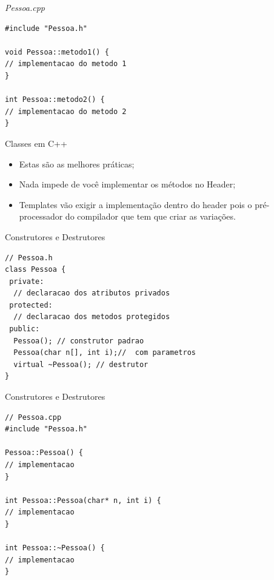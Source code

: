 \documentclass[12pt,table,xcolor={dvipsnames}]{beamer}
\begin{document}
\begin{frame}[fragile]{\textit{Pessoa.cpp}}
\begin{lstlisting}
#include "Pessoa.h"

void Pessoa::metodo1() {
// implementacao do metodo 1
}

int Pessoa::metodo2() {
// implementacao do metodo 2
}
\end{lstlisting}
\end{frame}

\begin{frame}{Classes em C++}
\begin{itemize}
\item Estas são as melhores práticas;
\item Nada impede de você implementar os métodos no Header;
\item Templates vão exigir a implementação dentro do header pois o pré-processador do compilador que tem que criar as variações.
\end{itemize}
\end{frame}

\begin{frame}[fragile]{Construtores e Destrutores}
\begin{lstlisting}
// Pessoa.h
class Pessoa {
 private:
  // declaracao dos atributos privados
 protected:
  // declaracao dos metodos protegidos
 public:
  Pessoa(); // construtor padrao
  Pessoa(char n[], int i);//  com parametros
  virtual ~Pessoa(); // destrutor
}
\end{lstlisting}
\end{frame}

\begin{frame}[fragile]{Construtores e Destrutores}
\begin{lstlisting}
// Pessoa.cpp
#include "Pessoa.h"

Pessoa::Pessoa() {
// implementacao 
}

int Pessoa::Pessoa(char* n, int i) {
// implementacao
}

int Pessoa::~Pessoa() {
// implementacao
}
\end{lstlisting}
\end{frame}
\end{document}
